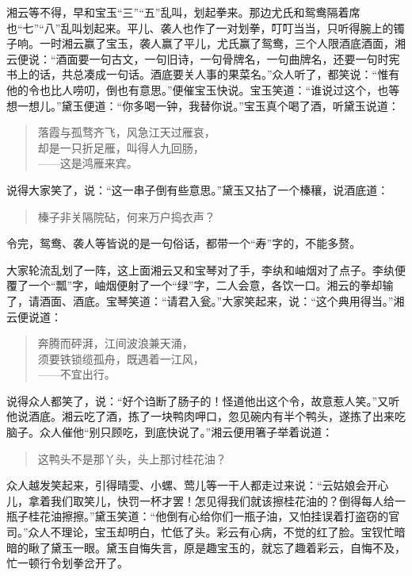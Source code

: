 \documentclass[12pt,oneside]{book}
\newenvironment{shici}{%
\begin{verse}%
\centering\large\hspace{12pt}}%
{\end{verse}}
\begin{document}
湘云等不得，早和宝玉“三”“五”乱叫，划起拳来。那边尤氏和鸳鸯隔着席也“七”“八”乱叫划起来。平儿、袭人也作了一对划拳，叮叮当当，只听得腕上的镯子响。一时湘云赢了宝玉，袭人赢了平儿，尤氏赢了鸳鸯，三个人限酒底酒面，湘云便说：“酒面要一句古文，一句旧诗，一句骨牌名，一句曲牌名，还要一句时宪书上的话，共总凑成一句话。酒底要关人事的果菜名。”众人听了，都笑说：“惟有他的令也比人唠叨，倒也有意思。”便催宝玉快说。宝玉笑道：“谁说过这个，也等想一想儿。”黛玉便道：“你多喝一钟，我替你说。”宝玉真个喝了酒，听黛玉说道：

\begin{shici}
落霞与孤骛齐飞，风急江天过雁哀，\\
却是一只折足雁，叫得人九回肠，\\
——这是鸿雁来宾。
\end{shici}


说得大家笑了，说：“这一串子倒有些意思。”黛玉又拈了一个榛穰，说酒底道：

\begin{shici}
榛子非关隔院砧，何来万户捣衣声？
\end{shici}

令完，鸳鸯、袭人等皆说的是一句俗话，都带一个“寿”字的，不能多赘。

大家轮流乱划了一阵，这上面湘云又和宝琴对了手，李纨和岫烟对了点子。李纨便覆了一个“瓢”字，岫烟便射了一个“绿”字，二人会意，各饮一口。湘云的拳却输了，请酒面、酒底。宝琴笑道：“请君入瓮。”大家笑起来，说：“这个典用得当。”湘云便说道：

\begin{shici}
奔腾而砰湃，江间波浪兼天涌，\\
须要铁锁缆孤舟，既遇着一江风，\\
——不宜出行。
\end{shici}


说得众人都笑了，说：“好个诌断了肠子的！怪道他出这个令，故意惹人笑。”又听他说酒底。湘云吃了酒，拣了一块鸭肉呷口，忽见碗内有半个鸭头，遂拣了出来吃脑子。众人催他“别只顾吃，到底快说了。”湘云便用箸子举着说道：

\begin{shici}
这鸭头不是那丫头，头上那讨桂花油？
\end{shici}


众人越发笑起来，引得晴雯、小螺、莺儿等一干人都走过来说：“云姑娘会开心儿，拿着我们取笑儿，快罚一杯才罢！怎见得我们就该擦桂花油的？倒得每人给一瓶子桂花油擦擦。”黛玉笑道：“他倒有心给你们一瓶子油，又怕挂误着打盗窃的官司。”众人不理论，宝玉却明白，忙低了头。彩云有心病，不觉的红了脸。宝钗忙暗暗的瞅了黛玉一眼。黛玉自悔失言，原是趣宝玉的，就忘了趣着彩云，自悔不及，忙一顿行令划拳岔开了。
\end{document}
